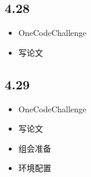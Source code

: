 \documentclass[UTF8]{ctexart}
\begin{document}
\subsection*{4.28}
\begin{itemize}
    \item OneCodeChallenge
    \item 写论文
\end{itemize}

\subsection*{4.29}
\begin{itemize}
    \item OneCodeChallenge
    \item 写论文
    \item 组会准备
    \item 环境配置
\end{itemize}
\end{document}
